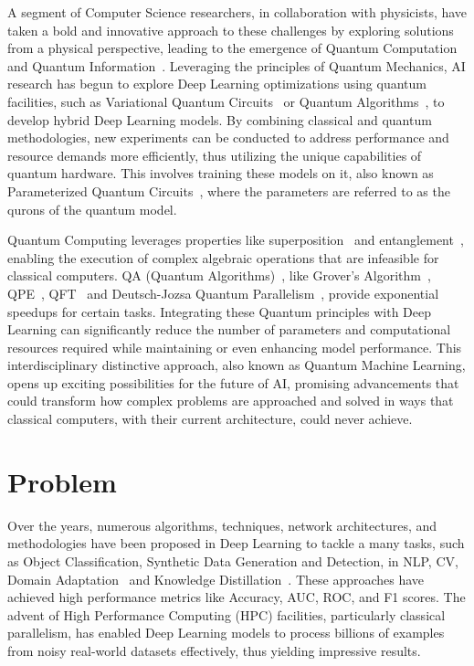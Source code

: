 \documentclass[12pt,a4paper]{report}
\begin{document}
A segment of Computer Science researchers, in collaboration with physicists, have taken a bold and innovative approach to these challenges by exploring solutions from a physical perspective, leading to the emergence of Quantum Computation and Quantum Information~\cite{nielsen2001quantum}. Leveraging the principles of Quantum Mechanics, AI research has begun to explore Deep Learning optimizations using quantum facilities, such as Variational Quantum Circuits~\cite{benedetti2019parameterized} or Quantum Algorithms~\cite{cerezo2021variational}, to develop hybrid Deep Learning models. By combining classical and quantum methodologies, new experiments can be conducted to address performance and resource demands more efficiently, thus utilizing the unique capabilities of quantum hardware. This involves training these models on it, also known as Parameterized Quantum Circuits~\cite{benedetti2019parameterized}, where the parameters are referred to as the qurons of the quantum model.

Quantum Computing leverages properties like superposition~\cite{koprinkov2023quantum} and entanglement~\cite{Horodecki_2009}, enabling the execution of complex algebraic operations that are infeasible for classical computers. QA (Quantum Algorithms)~\cite{cerezo2021variational}, like Grover's Algorithm~\cite{shi2017coherence}, QPE~\cite{o2019quantum}, QFT~\cite{weinstein2001implementation} and Deutsch-Jozsa Quantum Parallelism~\cite{gulde2003implementation}, provide exponential speedups for certain tasks. Integrating these Quantum principles with Deep Learning can significantly reduce the number of parameters and computational resources required while maintaining or even enhancing model performance. This interdisciplinary distinctive approach, also known as Quantum Machine Learning, opens up exciting possibilities for the future of AI, promising advancements that could transform how complex problems are approached and solved in ways that classical computers, with their current architecture, could never achieve.
\section{Problem}\vspace{-12pt}
Over the years, numerous algorithms, techniques, network architectures, and methodologies have been proposed in Deep Learning to tackle a many tasks, such as Object Classification, Synthetic Data Generation and Detection, in NLP, CV, Domain Adaptation~\cite{farahani2020brief} and Knowledge Distillation~\cite{hinton2015distilling}. These approaches have achieved high performance metrics like Accuracy, AUC, ROC, and F1 scores. The advent of High Performance Computing (HPC) facilities, particularly classical parallelism, has enabled Deep Learning models to process billions of examples from noisy real-world datasets effectively, thus yielding impressive results.
\end{document}
